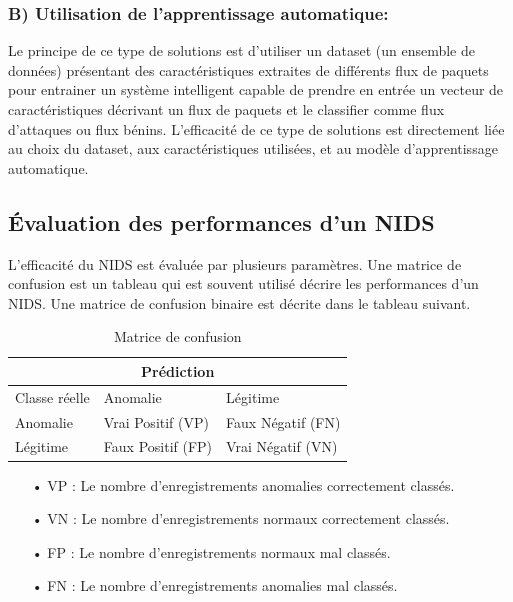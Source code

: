 \subsubsection{B) Utilisation de l’apprentissage automatique:}
Le principe de ce type de solutions est d’utiliser un dataset (un ensemble de données) présentant des caractéristiques extraites de différents flux de paquets pour entrainer un système intelligent capable de prendre en entrée un vecteur de caractéristiques décrivant un flux de paquets et le classifier comme flux d’attaques ou flux bénins. 
L’efficacité de ce type de solutions est directement liée au choix du dataset, aux caractéristiques utilisées,  et au modèle d’apprentissage automatique.

\subsection{Évaluation des performances d'un NIDS}
\label{evaluation}
L'efficacité du NIDS est évaluée par plusieurs paramètres. Une matrice de confusion est un tableau qui est souvent utilisé décrire les performances d'un NIDS. Une matrice de confusion binaire est décrite dans le tableau suivant.
\begin{table}[h]
	\begin{center}
		\begin{tabular}{  | m{4cm} | m{4cm} | m{4cm} | }
			\multicolumn{3}{c}{Prédiction}\\
			\hline
			Classe réelle  & Anomalie & Légitime\\
			\hline
			Anomalie & Vrai Positif (VP) & Faux Négatif (FN)\\
			\hline
			Légitime & Faux Positif (FP) & Vrai Négatif (VN)\\
			\hline
		\end{tabular}
		\caption{Matrice de confusion}
	\end{center}
	\label{table:NIDS_Evaluation}
\end{table}

\begin{itemize}
	\item[• VP] : Le nombre d’enregistrements anomalies correctement classés.\\
	\item[• VN] : Le nombre d’enregistrements normaux correctement classés.\\
	\item[• FP] : Le nombre d’enregistrements normaux mal classés.\\
	\item[• FN] : Le nombre d’enregistrements anomalies mal classés.\\ 
\end{itemize}

